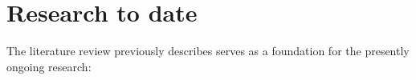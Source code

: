 \documentclass[titlepage,11pt,letterpaper]{article}
\numberwithin{equation}{subsection}
\begin{document}



















\section{Research to date}

The literature review previously describes serves as a foundation for the presently ongoing research:




\end{document}
